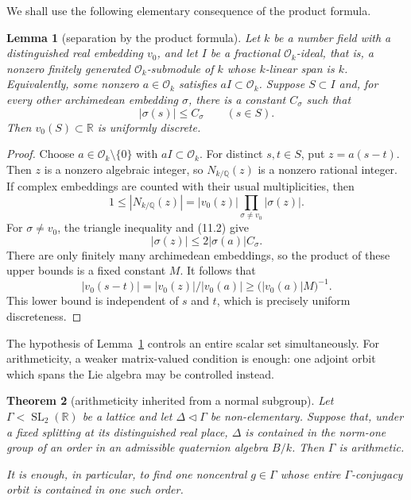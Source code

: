 \documentclass[11pt,reqno]{amsart}
\newtheorem{theorem}{Theorem}[section]
\newtheorem{lemma}[theorem]{Lemma}
\theoremstyle{definition}
\theoremstyle{remark}
\newcommand{\R}{\mathbb R}
\newcommand{\Q}{\mathbb Q}
\newcommand{\cO}{\mathcal O}
\newcommand{\SL}{\operatorname{SL}}
\begin{document}
We shall use the following elementary consequence of the product formula.

\begin{lemma}[separation by the product formula]\label{lem:galois-window}
Let \(k\) be a number field with a distinguished real embedding \(v_0\), and
let \(I\) be a fractional \(\cO_k\)-ideal, that is, a nonzero finitely
generated \(\cO_k\)-submodule of \(k\) whose \(k\)-linear span is \(k\).
Equivalently, some nonzero \(a\in\cO_k\) satisfies
\(aI\subset\cO_k\).
Suppose \(S\subset I\) and,
for every other archimedean embedding \(\sigma\), there is a constant
\(C_\sigma\) such that
\[
 |\sigma(s)|\le C_\sigma\qquad(s\in S).
\tag{11.2}
\]
Then \(v_0(S)\subset\R\) is uniformly discrete.
\end{lemma}

\begin{proof}
Choose \(a\in\cO_k\setminus\{0\}\) with \(aI\subset\cO_k\).  For distinct
\(s,t\in S\), put \(z=a(s-t)\).  Then \(z\) is a nonzero algebraic integer,
so \(N_{k/\Q}(z)\) is a nonzero rational integer.  If complex embeddings are
counted with their usual multiplicities, then
\[
 1\le |N_{k/\Q}(z)|
   =|v_0(z)|\prod_{\sigma\ne v_0}|\sigma(z)|.
\]
For \(\sigma\ne v_0\), the triangle inequality and (11.2) give
\[
 |\sigma(z)|\le 2|\sigma(a)|C_\sigma.
\]
There are only finitely many archimedean embeddings, so the product of these
upper bounds is a fixed constant \(M\).  It follows that
\[
 |v_0(s-t)|=|v_0(z)|/|v_0(a)|
 \ge \bigl(|v_0(a)|M\bigr)^{-1}.
\]
This lower bound is independent of \(s\) and \(t\), which is precisely
uniform discreteness.
\end{proof}

The hypothesis of Lemma~\ref{lem:galois-window} controls an entire scalar
set simultaneously.  For arithmeticity, a weaker matrix-valued condition is
enough: one adjoint orbit which spans the Lie algebra may be controlled
instead.

\begin{theorem}[arithmeticity inherited from a normal subgroup]
\label{thm:normal-skeleton}
Let \(\Gamma<\SL_2(\R)\) be a lattice and let
\(\Delta\triangleleft\Gamma\) be non-elementary.  Suppose that, under a
fixed splitting at its distinguished real place, \(\Delta\) is contained in
the norm-one group of an order in an admissible quaternion algebra \(B/k\).
Then \(\Gamma\) is arithmetic.

It is enough, in particular, to find one noncentral \(g\in\Gamma\) whose
entire \(\Gamma\)-conjugacy orbit is contained in one such order.
\end{theorem}
\end{document}
